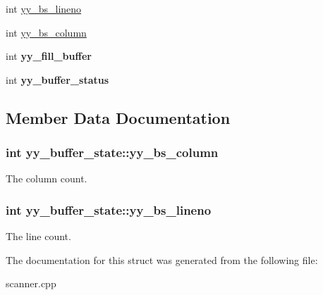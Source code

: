 \begin{DoxyCompactItemize}
\item 
int \hyperlink{structyy__buffer__state_a818e94bc9c766e683c60df1e9fd01199}{yy\_\-bs\_\-lineno}
\item 
int \hyperlink{structyy__buffer__state_a10c4fcd8be759e6bf11e6d3e8cdb0307}{yy\_\-bs\_\-column}
\item 
\hypertarget{structyy__buffer__state_a63d2afbb1d79a3fc63df9e12626f827d}{
int {\bfseries yy\_\-fill\_\-buffer}}
\label{structyy__buffer__state_a63d2afbb1d79a3fc63df9e12626f827d}

\item 
\hypertarget{structyy__buffer__state_a70fd925d37a2f0454fbd0def675d106c}{
int {\bfseries yy\_\-buffer\_\-status}}
\label{structyy__buffer__state_a70fd925d37a2f0454fbd0def675d106c}

\end{DoxyCompactItemize}


\subsection{Member Data Documentation}
\hypertarget{structyy__buffer__state_a10c4fcd8be759e6bf11e6d3e8cdb0307}{
\subsubsection[{yy\_\-bs\_\-column}]{\setlength{\rightskip}{0pt plus 5cm}int {\bf yy\_\-buffer\_\-state::yy\_\-bs\_\-column}}}
\label{structyy__buffer__state_a10c4fcd8be759e6bf11e6d3e8cdb0307}
The column count. \hypertarget{structyy__buffer__state_a818e94bc9c766e683c60df1e9fd01199}{
\subsubsection[{yy\_\-bs\_\-lineno}]{\setlength{\rightskip}{0pt plus 5cm}int {\bf yy\_\-buffer\_\-state::yy\_\-bs\_\-lineno}}}
\label{structyy__buffer__state_a818e94bc9c766e683c60df1e9fd01199}
The line count. 

The documentation for this struct was generated from the following file:\begin{DoxyCompactItemize}
\item 
scanner.cpp\end{DoxyCompactItemize}
